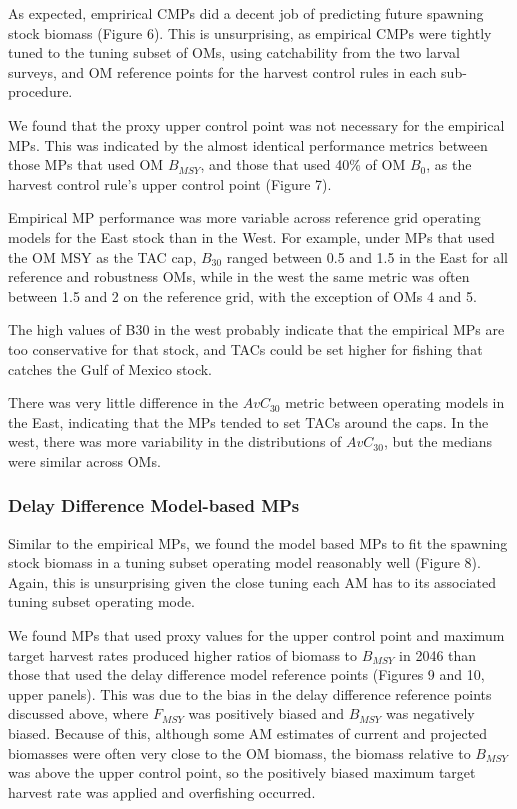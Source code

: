 \documentclass[]{article}
\begin{document}
As expected, emprirical CMPs did a decent job of
predicting future spawning stock biomass (Figure 6).
This is unsurprising, as empirical CMPs were tightly
tuned to the tuning subset of OMs, using catchability
from the two larval surveys, and OM reference points
for the harvest control rules in each sub-procedure.

We found that the proxy upper control point was not
necessary for the empirical MPs. This was indicated
by the almost identical performance metrics between
those MPs that used OM \(B_{MSY}\), and those that used
40\% of OM \(B_0\), as the harvest control rule's upper
control point (Figure 7).

Empirical MP performance was more variable across
reference grid operating models for the East stock
than in the West. For example, under MPs that
used the OM MSY as the TAC cap, \(B_{30}\) ranged
between 0.5 and 1.5 in the East for all reference
and robustness OMs, while in the west the same metric
was often between 1.5 and 2 on the reference grid,
with the exception of OMs 4 and 5.

The high values of B30 in the west probably indicate that
the empirical MPs are too conservative for that stock,
and TACs could be set higher for fishing that catches
the Gulf of Mexico stock.

There was very little difference in the \(AvC_{30}\) metric between
operating models in the East, indicating that the MPs tended to
set TACs around the caps. In the west, there was more variability
in the distributions of \(AvC_{30}\), but the medians were similar
across OMs.

\hypertarget{delay-difference-model-based-mps}{%
\subsubsection{Delay Difference Model-based MPs}\label{delay-difference-model-based-mps}}

Similar to the empirical MPs, we found the model based
MPs to fit the spawning stock biomass in a tuning subset
operating model reasonably well (Figure 8). Again, this is
unsurprising given the close tuning each AM has to its
associated tuning subset operating mode.

We found MPs that used proxy values for the upper control point
and maximum target harvest rates produced higher ratios
of biomass to \(B_{MSY}\) in 2046 than those that used the delay
difference model reference points (Figures 9 and 10, upper panels).
This was due to the bias in the delay difference reference
points discussed above, where \(F_{MSY}\) was positively biased
and \(B_{MSY}\) was negatively biased. Because of this, although some
AM estimates of current and projected biomasses were
often very close to the OM biomass, the biomass relative
to \(B_{MSY}\) was above the upper control point, so
the positively biased maximum target harvest rate was
applied and overfishing occurred.
\end{document}
